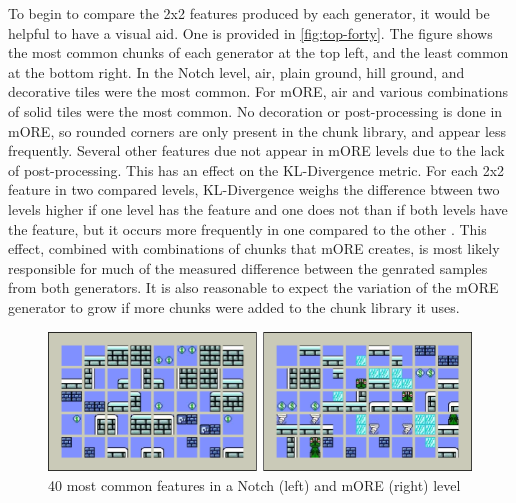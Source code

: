 To begin to compare the 2x2 features produced by each generator, it would be helpful to have
a visual aid. One is provided in \autoref{fig:top-forty}. The figure shows the most common
chunks of each generator at the top left, and the least common at the bottom right. In the
Notch level, air, plain ground, hill ground, and decorative tiles were the most common. For
mORE, air and various combinations of solid tiles were the most common. No decoration or
post-processing is done in mORE, so rounded corners are only present in the chunk library,
and appear less frequently. Several other features due not appear in mORE levels due to the 
lack of post-processing. This has an effect on the KL-Divergence metric. For each 2x2 feature
in two compared levels, KL-Divergence weighs the difference btween two levels higher if one
level has the feature and one does not than if both levels have the feature, but it occurs
more frequently in one compared to the other \cite{lucas2019}. This effect, combined with
combinations of chunks that mORE creates, is most likely responsible for much of the measured
difference between the genrated samples from both generators. It is also reasonable to expect
the variation of the mORE generator to grow if more chunks were added to the chunk library
it uses.

\begin{figure}[ht]
    \centering
    \includegraphics[width=\linewidth]{img/fig18-top40.png}
    \caption{40 most common features in a Notch (left) and mORE (right) level}
    \label{fig:top-forty}
\end{figure}

